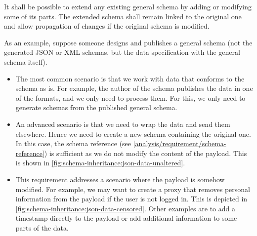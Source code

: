 \begin{requirement}
    It shall be possible to extend any existing general schema by adding or modifying some of its parts. The extended schema shall remain linked to the original one and allow propagation of changes if the original schema is modified.
    \label{requirement:schema-inheritance}
\end{requirement}

As an example, suppose someone designs and publishes a general schema (not the generated JSON or XML schemas, but the data specification with the general schema itself).

\begin{itemize}
    \item The most common scenario is that we work with data that conforms to the schema as is. For example, the author of the schema publishes the data in one of the formats, and we only need to process them. For this, we only need to generate schemas from the published general schema.
    \item An advanced scenario is that we need to wrap the data and send them elsewhere. Hence we need to create a new schema containing the original one. In this case, the schema reference (see \autoref{analysis/requirement/schema-reference}) is sufficient as we do not modify the content of the payload. This is shown in \autoref{fig:schema-inheritance:json-data-unaltered}.
    \item This requirement addresses a scenario where the payload is somehow modified. For example, we may want to create a proxy that removes personal information from the payload if the user is not logged in. This is depicted in \autoref{fig:schema-inheritance:json-data-censored}. Other examples are to add a timestamp directly to the payload or add additional information to some parts of the data.
\end{itemize}

